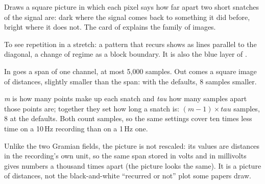 Draws a square picture in which each pixel says how far apart two short snatches of the
signal are: dark where the signal comes back to something it did before, bright where it
does not. The card of  explains the family of images.

To see repetition in a stretch: a pattern that recurs shows as lines parallel to the
diagonal, a change of regime as a block boundary. It is also the blue layer of
.

In goes a span of one channel, at most 5{,}000 samples. Out comes a square image of
distances, slightly smaller than the span: with the defaults, 8 samples smaller.

\emph{m} is how many points make up each snatch and \emph{tau} how many samples apart those
points are; together they set how long a snatch is: $(m-1) \times \mathit{tau}$ samples, 8 at
the defaults. Both count samples, so the same settings cover ten times less time on a 10\,Hz
recording than on a 1\,Hz one.

Unlike the two Gramian fields, the picture is not rescaled: its values are distances in the
recording's own unit, so the same span stored in volts and in millivolts gives numbers a
thousand times apart (the picture looks the same). It is a picture of distances, not the
black-and-white ``recurred or not'' plot some papers draw.
